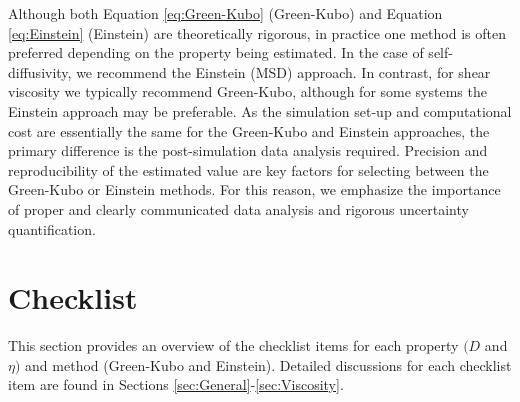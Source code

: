\documentclass[9pt,bestpractices]{livecoms}
\begin{document}
Although both Equation \ref{eq:Green-Kubo} (Green-Kubo) and Equation \ref{eq:Einstein} (Einstein) are theoretically rigorous, in practice one method is often preferred depending on the property being estimated. In the case of self-diffusivity, we recommend the Einstein (MSD) approach. In contrast, for shear viscosity we typically recommend Green-Kubo, although for some systems the Einstein approach may be preferable. As the simulation set-up and computational cost are essentially the same for the Green-Kubo and Einstein approaches, the primary difference is the post-simulation data analysis required. Precision and reproducibility of the estimated value are key factors for selecting between the Green-Kubo or Einstein methods. For this reason, we emphasize the importance of proper and clearly communicated data analysis and rigorous uncertainty quantification.

\section{Checklist} \label{Checklist}

This section provides an overview of the checklist items for each property $(D$ and $\eta)$ and method (Green-Kubo and Einstein). Detailed discussions for each checklist item are found in Sections \ref{sec:General}-\ref{sec:Viscosity}.

\end{document}
